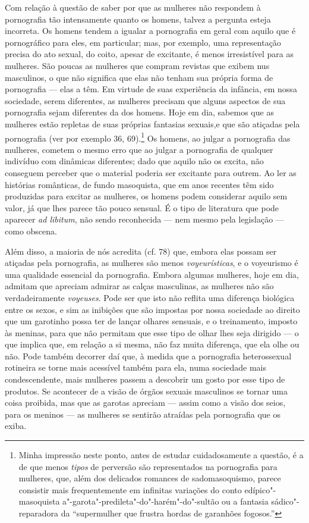 Com relação à questão de saber por que as mulheres não respondem à
pornografia tão intensamente quanto os homens, talvez a pergunta esteja
incorreta. Os homens tendem a igualar a pornografia em geral com aquilo
que é pornográfico para eles, em particular; mas, por exemplo, uma
representação precisa do ato sexual, do coito, apesar de excitante, é
menos irresistível para as mulheres. São poucas as mulheres que
compram revistas que exibem nus masculinos, o que não significa que
elas não tenham sua própria forma de pornografia --- elas a têm. Em
virtude de suas experiência da infância, em nossa sociedade, serem
diferentes, as mulheres precisam que alguns aspectos de sua pornografia
sejam diferentes da dos homens. Hoje em dia, sabemos que as mulheres
estão repletas de suas próprias fantasias sexuais,\idxfantamulh[|(] e que são atiçadas
pela pornografia (ver por exemplo 36, 69).\footnote{ Minha impressão
neste ponto, antes de estudar cuidadosamente a questão, é a de que
menos \textit{tipos} de perversão são representados na pornografia para
mulheres, que, além dos delicados romances de sadomasoquismo, parece
consistir mais frequentemente em infinitas variações do conto
edípico"-masoquista a"-garota"-predileta"-do"-harém"-do"-sultão ou a fantasia
sádico"-reparadora da ``supermulher que frustra hordas de
garanhões fogosos.''} Os homens, ao julgar a pornografia
das mulheres, cometem o mesmo erro que ao julgar a pornografia de
qualquer indivíduo com dinâmicas diferentes; dado que aquilo não os
excita, não conseguem perceber que o material poderia ser excitante
para outrem. Ao ler as histórias românticas, de fundo masoquista, que
em anos recentes têm sido produzidas para excitar as mulheres, os
homens podem considerar aquilo sem valor, já que lhes parece tão pouco
sensual. É o tipo de literatura que pode aparecer \textit{ad libitum},
não sendo reconhecida --- nem mesmo pela legislação --- como obscena.

Além disso, a maioria de nós acredita (cf. 78) que, embora elas
possam ser atiçadas pela pornografia, as mulheres são menos
\emph{voyeurísticas},\idxvoy{} e o voyeurismo é uma qualidade essencial da pornografia.
Embora algumas mulheres, hoje em dia, admitam que apreciam admirar as
calças masculinas, as mulheres não são verdadeiramente\textit{
\emph{voyeuses}}. Pode ser que isto não reflita uma diferença biológica entre
os sexos, e sim as inibições que são impostas por nossa sociedade ao
direito que um garotinho possa ter de lançar olhares sensuais, e o
treinamento, imposto às meninas, para que não permitam que esse tipo de
olhar lhes seja dirigido --- o que implica que, em relação a si mesma,
não faz muita diferença, que ela olhe ou não. Pode também decorrer daí
que, à medida que a pornografia heterossexual rotineira se torne mais
acessível também para ela, numa sociedade mais condescendente, mais
mulheres passem a descobrir um gosto por esse tipo de produtos. Se
acontecer de a visão de órgãos sexuais masculinos\idxpenisporn{} se tornar uma coisa
proibida, mas que as garotas apreciam --- assim como a visão dos
seios, para os meninos --- as mulheres se sentirão atraídas pela
pornografia que os exiba.

